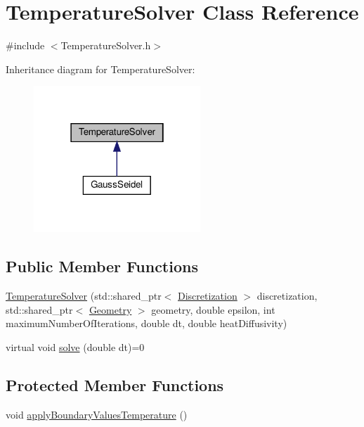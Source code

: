 \hypertarget{classTemperatureSolver}{}\section{Temperature\+Solver Class Reference}
\label{classTemperatureSolver}


{\ttfamily \#include $<$Temperature\+Solver.\+h$>$}



Inheritance diagram for Temperature\+Solver\+:
\nopagebreak
\begin{figure}[H]
\begin{center}
\leavevmode
\includegraphics[width=178pt]{classTemperatureSolver__inherit__graph}
\end{center}
\end{figure}
\subsection*{Public Member Functions}
\begin{DoxyCompactItemize}
\item 
\mbox{\hyperlink{classTemperatureSolver_a8e3ca429cd802f7d8753f6e08cb70010}{Temperature\+Solver}} (std\+::shared\+\_\+ptr$<$ \mbox{\hyperlink{classDiscretization}{Discretization}} $>$ discretization, std\+::shared\+\_\+ptr$<$ \mbox{\hyperlink{classGeometry}{Geometry}} $>$ geometry, double epsilon, int maximum\+Number\+Of\+Iterations, double dt, double heat\+Diffusivity)
\item 
virtual void \mbox{\hyperlink{classTemperatureSolver_a6da00c3ea7978b30f1920dc9ea914ed6}{solve}} (double dt)=0
\end{DoxyCompactItemize}
\subsection*{Protected Member Functions}
\begin{DoxyCompactItemize}
\item 
void \mbox{\hyperlink{classTemperatureSolver_a33dd522855ad93bd9fb06a62683df576}{apply\+Boundary\+Values\+Temperature}} ()
\end{DoxyCompactItemize}
